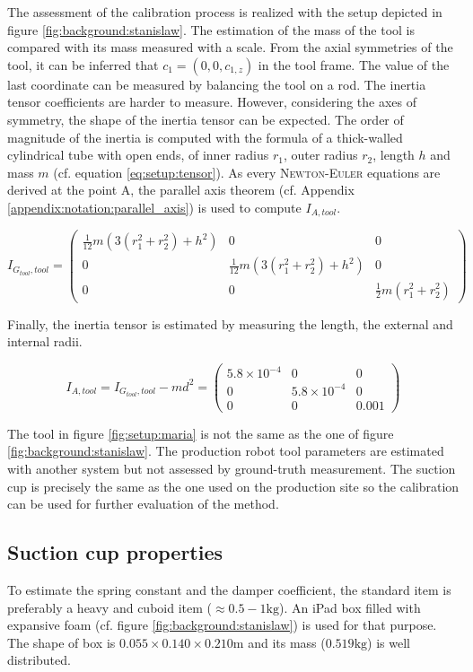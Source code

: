 \documentclass[/home/francois/latex/report/main.tex]{subfiles}
\begin{document}
The assessment of the calibration process is realized with the setup depicted in figure \ref{fig:background:stanislaw}. The estimation of the mass of the tool is compared with its mass measured with a scale. From the axial symmetries of the tool, it can be inferred that $c_1 = (0, 0, c_{1,z})$ in the tool frame. The value of the last coordinate can be measured by balancing the tool on a rod. The inertia tensor coefficients are harder to measure. However, considering the axes of symmetry, the shape of the inertia tensor can be expected. The order of magnitude of the inertia is computed with the formula of a thick-walled cylindrical tube with open ends, of inner radius $r_1$, outer radius $r_2$, length $h$ and mass $m$ (cf. equation \ref{eq:setup:tensor}). As every \textsc{Newton-Euler} equations are derived at the point A, the parallel axis theorem (cf. Appendix \ref{appendix:notation:parallel_axis}) is used to compute $I_{A, tool}$.

\begin{equation}
  \label{eq:setup:tensor}
  I_{G_{tool}, tool} =
  \begin{pmatrix}
  \frac{1}{12} m(3(r_1^2+r_2^2) + h^2) & 0 & 0  \\
  0 & \frac{1}{12} m(3(r_1^2+r_2^2) + h^2) & 0 \\
  0 & 0 & \frac{1}{2} m(r_1^2+r_2^2)
  \end{pmatrix}
\end{equation}

Finally, the inertia tensor is estimated by measuring the length, the external and internal radii.

\begin{equation*}
  I_{A, tool} = I_{G_{tool}, tool} - m d^2 =
  \begin{pmatrix}
  5.8 \times 10^{-4} & 0 & 0  \\
  0 & 5.8 \times 10^{-4} & 0 \\
  0 & 0 & 0.001
  \end{pmatrix}
\end{equation*}

The tool in figure \ref{fig:setup:maria} is not the same as the one of figure \ref{fig:background:stanislaw}. The production robot tool parameters are estimated with another system but not assessed by ground-truth measurement. The suction cup is precisely the same as the one used on the production site so the calibration can be used for further evaluation of the method.

\subsection{Suction cup properties}

To estimate the spring constant and the damper coefficient, the standard item is preferably a heavy and cuboid item ($\approx 0.5-1 \si{\kilogram}$). An iPad box filled with expansive foam (cf. figure \ref{fig:background:stanislaw}) is used for that purpose. The shape of box is $0.055 \times 0.140 \times 0.210 \si{\meter}$ and its mass ($0.519 \si{\kilogram}$) is well distributed.
\end{document}

